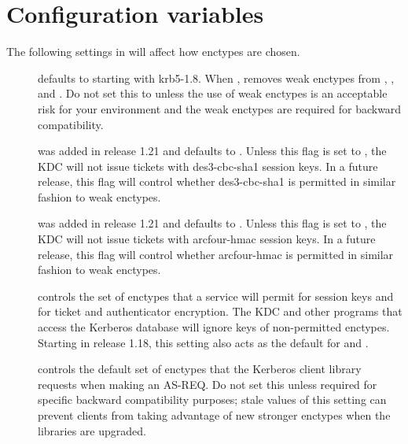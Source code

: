 \documentclass[letterpaper,10pt,english]{sphinxmanual}
\begin{document}
\section{Configuration variables}
\label{\detokenize{admin/enctypes:configuration-variables}}
The following \sphinxcode{{[}libdefaults{]}} settings in {\hyperref[\detokenize{admin/conf_files/krb5_conf:krb5-conf-5}]{}} will
affect how enctypes are chosen.
\begin{description}
\item[{}] \leavevmode
defaults to  starting with krb5-1.8.  When , removes
weak enctypes from ,
, and .  Do not
set this to  unless the use of weak enctypes is an
acceptable risk for your environment and the weak enctypes are
required for backward compatibility.

\item[{}] \leavevmode
was added in release 1.21 and defaults to .  Unless this
flag is set to , the KDC will not issue tickets with
des3-cbc-sha1 session keys.  In a future release, this flag will
control whether des3-cbc-sha1 is permitted in similar fashion to
weak enctypes.

\item[{}] \leavevmode
was added in release 1.21 and defaults to .  Unless this
flag is set to , the KDC will not issue tickets with
arcfour-hmac session keys.  In a future release, this flag will
control whether arcfour-hmac is permitted in similar fashion to
weak enctypes.

\item[{}] \leavevmode
controls the set of enctypes that a service will permit for
session keys and for ticket and authenticator encryption.  The KDC
and other programs that access the Kerberos database will ignore
keys of non-permitted enctypes.  Starting in release 1.18, this
setting also acts as the default for  and
.

\item[{}] \leavevmode
controls the default set of enctypes that the Kerberos client
library requests when making an AS-REQ.  Do not set this unless
required for specific backward compatibility purposes; stale
values of this setting can prevent clients from taking advantage
of new stronger enctypes when the libraries are upgraded.


\end{description}
\end{document}
